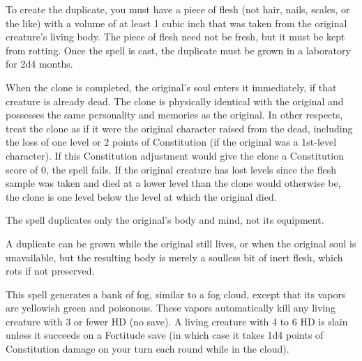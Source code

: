\begin{multicols}{2}
\begin{small}
\smallskip\noindent To create the duplicate, you must have a piece of flesh (not hair, nails, scales, or the like) with a volume of at least 1 cubic inch that was taken from the original creature's living body. The piece of flesh need not be fresh, but it must be kept from rotting. Once the spell is cast, the duplicate must be grown in a laboratory for 2d4 months.

\smallskip\noindent When the clone is completed, the original's soul enters it immediately, if that creature is already dead. The clone is physically identical with the original and possesses the same personality and memories as the original. In other respects, treat the clone as if it were the original character raised from the dead, including the loss of one level or 2 points of Constitution (if the original was a 1st-level character). If this Constitution adjustment would give the clone a Constitution score of 0, the spell fails. If the original creature has lost levels since the flesh sample was taken and died at a lower level than the clone would otherwise be, the clone is one level below the level at which the original died.

\smallskip\noindent The spell duplicates only the original's body and mind, not its equipment.

\smallskip\noindent A duplicate can be grown while the original still lives, or when the original soul is unavailable, but the resulting body is merely a soulless bit of inert flesh, which rots if not preserved.


\noindent This spell generates a bank of fog, similar to a fog cloud, except that its vapors are yellowish green and poisonous. These vapors automatically kill any living creature with 3 or fewer HD (no save). A living creature with 4 to 6 HD is slain unless it succeeds on a Fortitude save (in which case it takes 1d4 points of Constitution damage on your turn each round while in the cloud).


\end{small}
\end{multicols}
